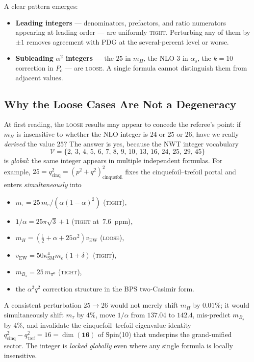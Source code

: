 \documentclass[11pt]{article}
\begin{document}
A clear pattern emerges:
\begin{itemize}
  \item \textbf{Leading integers} --- denominators, prefactors, and
        ratio numerators appearing at leading order --- are uniformly
        \textsc{tight}.  Perturbing any of them by $\pm 1$ removes
        agreement with PDG at the several-percent level or worse.
  \item \textbf{Subleading $\alpha^2$ integers} --- the $25$ in
        $m_H$, the NLO $3$ in $\alpha_s$, the $k=10$ correction in
        $P_c$ --- are \textsc{loose}.  A single formula cannot
        distinguish them from adjacent values.
\end{itemize}

\subsection{Why the Loose Cases Are Not a Degeneracy}

At first reading, the \textsc{loose} results may appear to concede
the referee's point: if $m_H$ is insensitive to whether the NLO
integer is $24$ or $25$ or $26$, have we really \emph{derived} the
value $25$?  The answer is yes, because the NWT integer vocabulary
\begin{equation}
  \mathcal{V} = \{2,\,3,\,4,\,5,\,6,\,7,\,8,\,9,\,10,\,13,\,16,
                   \,24,\,25,\,29,\,45\}
\end{equation}
is \emph{global}: the same integer appears in multiple independent
formulas.  For example, $25 = q^2_\text{cinq} = (p^2{+}q^2)_\text{cinquefoil}^2$
fixes the cinquefoil--trefoil portal and enters
\emph{simultaneously} into
\begin{itemize}
  \item $m_\tau = 25\,m_e / (\alpha(1-\alpha)^2)$ (\textsc{tight}),
  \item $1/\alpha = 25\pi\sqrt{3} + 1$ (\textsc{tight} at~$7.6$~ppm),
  \item $m_H = (\tfrac{1}{2}+\alpha+25\alpha^2)v_\text{EW}$ (\textsc{loose}),
  \item $v_\text{EW} = 50\kappa_\text{SM}^4 m_e (1+\delta)$ (\textsc{tight}),
  \item $m_{B_s} = 25\,m_{\pi^0}$ (\textsc{tight}),
  \item the $\alpha^2 q^2$ correction structure in the BPS two-Casimir form.
\end{itemize}
A consistent perturbation $25 \to 26$ would not merely shift $m_H$
by $0.01\%$; it would simultaneously shift $m_\tau$ by $4\%$, move
$1/\alpha$ from $137.04$ to $142.4$, mis-predict $m_{B_s}$ by $4\%$,
and invalidate the cinquefoil--trefoil eigenvalue identity
$q^2_\text{cinq} - q^2_\text{tref} = 16 = \dim(\mathbf{16})$ of
Spin(10) that underpins the grand-unified sector.  The integer is
\emph{locked globally} even where any single formula is locally
insensitive.
\end{document}
